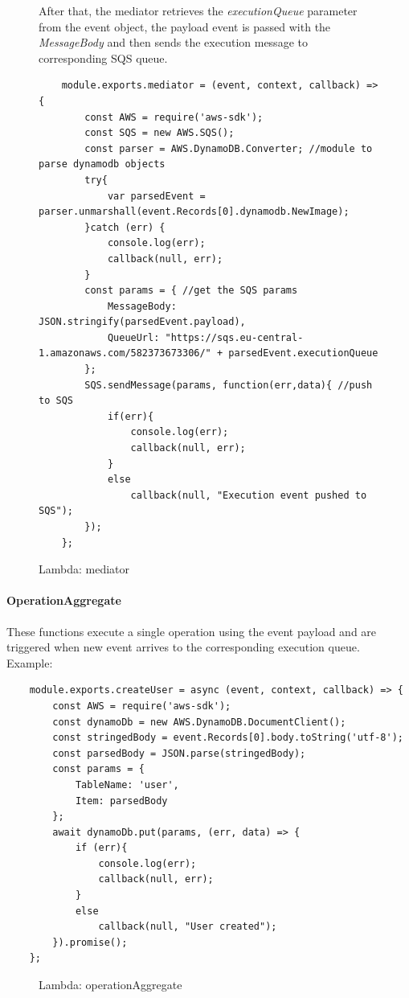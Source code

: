 \begin{figure} [H]

After that, the mediator retrieves the \emph{executionQueue} parameter from the event object, the payload event is passed with the \emph{MessageBody} and then sends the execution message to corresponding SQS queue. 
\begin{lstlisting}
	module.exports.mediator = (event, context, callback) => { 
		const AWS = require('aws-sdk');
		const SQS = new AWS.SQS();
		const parser = AWS.DynamoDB.Converter; //module to parse dynamodb objects
		try{
			var parsedEvent = parser.unmarshall(event.Records[0].dynamodb.NewImage); 
		}catch (err) {
			console.log(err);
			callback(null, err);
		}
		const params = { //get the SQS params 
			MessageBody: JSON.stringify(parsedEvent.payload),
			QueueUrl: "https://sqs.eu-central-1.amazonaws.com/582373673306/" + parsedEvent.executionQueue
		};
		SQS.sendMessage(params, function(err,data){ //push to SQS
			if(err){
				console.log(err);
				callback(null, err);
			}
			else
				callback(null, "Execution event pushed to SQS");
		});
	};
\end{lstlisting}
	\caption{Lambda: mediator}
\end{figure}


\paragraph{OperationAggregate} \Spazio
These functions execute a single operation using the event payload and are triggered when new event arrives to the corresponding execution queue.\\
Example:
\begin{lstlisting}
	module.exports.createUser = async (event, context, callback) => {
		const AWS = require('aws-sdk');
		const dynamoDb = new AWS.DynamoDB.DocumentClient();
		const stringedBody = event.Records[0].body.toString('utf-8');
		const parsedBody = JSON.parse(stringedBody);
		const params = {
			TableName: 'user',
			Item: parsedBody
		};
		await dynamoDb.put(params, (err, data) => {
			if (err){
				console.log(err);
				callback(null, err);
			}
			else
				callback(null, "User created");
		}).promise();
	};
\end{lstlisting}
\begin{figure} [H]
	\caption{Lambda: operationAggregate}
\end{figure}

